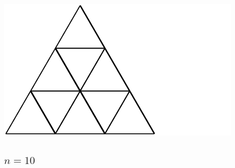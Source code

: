 \documentclass[12pt,amstags,fleqn]{article}
\theoremstyle{plain}
\theoremstyle{definition}
\begin{document}
\includegraphics{output-dissections-dissection9_i45_r0_c0.pdf}

\subsection*{$n = 10$}
\end{document}
